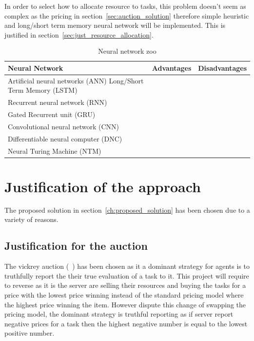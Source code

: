 \documentclass[sotoncolour]{uosproject}     %
\begin{document}
In order to select how to allocate resource to tasks, this problem doesn't seem as complex as the pricing in
section~\ref{sec:auction_solution} therefore simple heuristic and long/short term memory neural network will be
implemented. This is justified in section~\ref{sec:just_resource_allocation}.


\begin{table}[]
    \centering
    \begin{tabular}{|l|c|c|}
        Neural Network & Advantages & Disadvantages \\ \hline
        Artificial neural networks (ANN)
        Long/Short Term Memory (LSTM) & & \\ \hline
        Recurrent neural network (RNN) & & \\ \hline
        Gated Recurrent unit (GRU) & & \\ \hline
        Convolutional neural network (CNN) & & \\ \hline
        Differentiable neural computer (DNC) & & \\ \hline
        Neural Turing Machine (NTM) & & \\ \hline
    \end{tabular}
    \caption{Neural network zoo}
    \label{tab:neural_networks}
\end{table}

\chapter{Justification of the approach}\label{ch:justification-of-the-approach}
The proposed solution in section~\ref{ch:proposed_solution} has been chosen due to a variety of reasons.

\section{Justification for the auction} \label{sec:just_auction}
The vickrey auction (~\cite{vickrey}) has been chosen as it a dominant strategy for agents is to truthfully report
the their true evaluation of a task to it. This project will require to reverse as it is the server are selling their
resources and buying the tasks for a price with the lowest price winning instead of the standard pricing model where
the  highest price winning the item. However dispute this change of swapping the pricing model, the dominant strategy
is truthful reporting as if server report negative prices for a task then the highest negative number is equal to the
lowest positive number.
\end{document}
